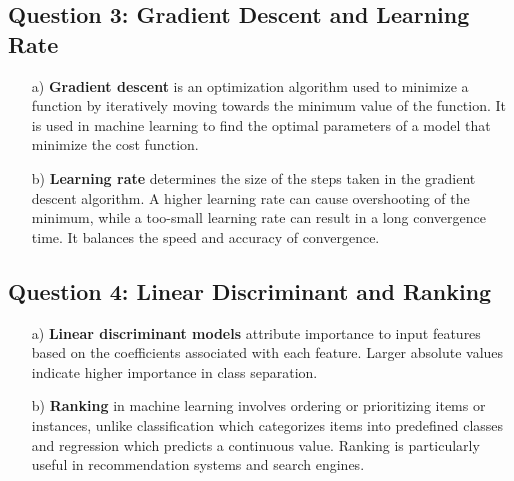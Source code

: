 \documentclass{article}
\begin{document}
\subsection*{Question 3: Gradient Descent and Learning Rate}
\begin{enumerate}
    \item[a)] \textbf{Gradient descent} is an optimization algorithm used to minimize a function by iteratively moving towards the minimum value of the function. It is used in machine learning to find the optimal parameters of a model that minimize the cost function.
    \item[b)] \textbf{Learning rate} determines the size of the steps taken in the gradient descent algorithm. A higher learning rate can cause overshooting of the minimum, while a too-small learning rate can result in a long convergence time. It balances the speed and accuracy of convergence.
\end{enumerate}

\subsection*{Question 4: Linear Discriminant and Ranking}
\begin{enumerate}
    \item[a)] \textbf{Linear discriminant models} attribute importance to input features based on the coefficients associated with each feature. Larger absolute values indicate higher importance in class separation.
    \item[b)] \textbf{Ranking} in machine learning involves ordering or prioritizing items or instances, unlike classification which categorizes items into predefined classes and regression which predicts a continuous value. Ranking is particularly useful in recommendation systems and search engines.
\end{enumerate}
\end{document}

